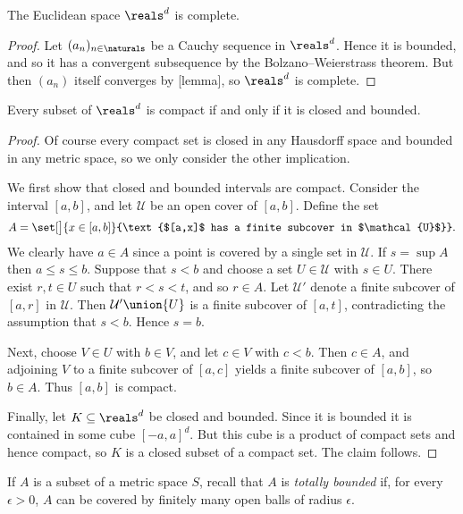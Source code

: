 \documentclass[article, a4paper, 11pt, oneside]{memoir}
\numberwithin{equation}{chapter}
\newcommand{\calU}{\mathcal{U}}
\begin{document}
\begin{theorem}
    The Euclidean space $\reals^d$ is complete.
\end{theorem}

\begin{proof}
    Let $(a_n)_{n\in\naturals}$ be a Cauchy sequence in $\reals^d$. Hence it is bounded, and so it has a convergent subsequence by the Bolzano--Weierstrass theorem. But then $(a_n)$ itself converges by [lemma], so $\reals^d$ is complete.
\end{proof}


\begin{theorem}
    Every subset of $\reals^d$ is compact if and only if it is closed and bounded.
\end{theorem}

\begin{proof}
    Of course every compact set is closed in any Hausdorff space and bounded in any metric space, so we only consider the other implication.
    
    We first show that closed and bounded intervals are compact. Consider the interval $[a,b]$, and let $\calU$ be an open cover of $[a,b]$. Define the set
    \begin{equation*}
        A
            = \set[\big]{x \in [a,b]}{\text{$[a,x]$ has a finite subcover in $\calU$}}.
    \end{equation*}
    We clearly have $a \in A$ since a point is covered by a single set in $\calU$. If $s = \sup A$ then $a \leq s \leq b$. Suppose that $s < b$ and choose a set $U \in \calU$ with $s \in U$. There exist $r,t \in U$ such that $r < s < t$, and so $r \in A$. Let $\calU'$ denote a finite subcover of $[a,r]$ in $\calU$. Then $\calU' \union \{U\}$ is a finite subcover of $[a,t]$, contradicting the assumption that $s < b$. Hence $s = b$.

    Next, choose $V \in U$ with $b \in V$, and let $c \in V$ with $c < b$. Then $c \in A$, and adjoining $V$ to a finite subcover of $[a,c]$ yields a finite subcover of $[a,b]$, so $b \in A$. Thus $[a,b]$ is compact.

    Finally, let $K \subseteq \reals^d$ be closed and bounded. Since it is bounded it is contained in some cube $[-a,a]^d$. But this cube is a product of compact sets and hence compact, so $K$ is a closed subset of a compact set. The claim follows.
\end{proof}


If $A$ is a subset of a metric space $S$, recall that $A$ is \emph{totally bounded} if, for every $\epsilon > 0$, $A$ can be covered by finitely many open balls of radius $\epsilon$.
\end{document}
